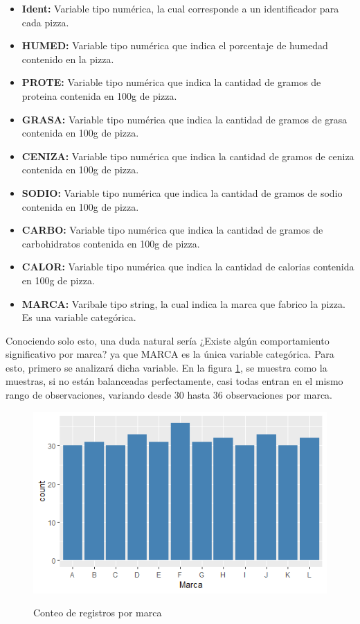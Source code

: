 \documentclass[12pt, letterpaper]{article}
\begin{document}
\begin{itemize}
\item \textbf{Ident:} Variable tipo numérica, la cual corresponde a un identificador para cada pizza.
\item \textbf{HUMED:} Variable tipo numérica que indica el porcentaje de humedad contenido en la pizza.
\item \textbf{PROTE:} Variable tipo numérica que indica la cantidad de gramos de proteina contenida en 100g de pizza.
\item \textbf{GRASA:} Variable tipo numérica que indica la cantidad de gramos de grasa contenida en 100g de pizza.
\item \textbf{CENIZA:} Variable tipo numérica que indica la cantidad de gramos de ceniza contenida en 100g de pizza.
\item \textbf{SODIO:} Variable tipo numérica que indica la cantidad de gramos de sodio contenida en 100g de pizza.
\item \textbf{CARBO:} Variable tipo numérica que indica la cantidad de gramos de carbohidratos contenida en 100g de pizza.
\item \textbf{CALOR:} Variable tipo numérica que indica la cantidad de calorias contenida en 100g de pizza.
\item \textbf{MARCA:} Varibale tipo string, la cual indica la marca que fabrico la pizza. Es una variable categórica.
\end{itemize}

Conociendo solo esto, una duda natural sería ¿Existe algún comportamiento significativo por marca? ya que MARCA es la única variable categórica. Para esto, primero se analizará dicha variable. En la figura \ref{i1}, se muestra como la muestras, si no están balanceadas perfectamente, casi todas entran en el mismo rango de observaciones, variando desde 30 hasta 36 observaciones por marca.\\

\begin{figure}[h]
\centering
\includegraphics[scale=1]{images/marca.png} 
\label{i1}
\caption{Conteo de registros por marca}
\end{figure}
\end{document}

